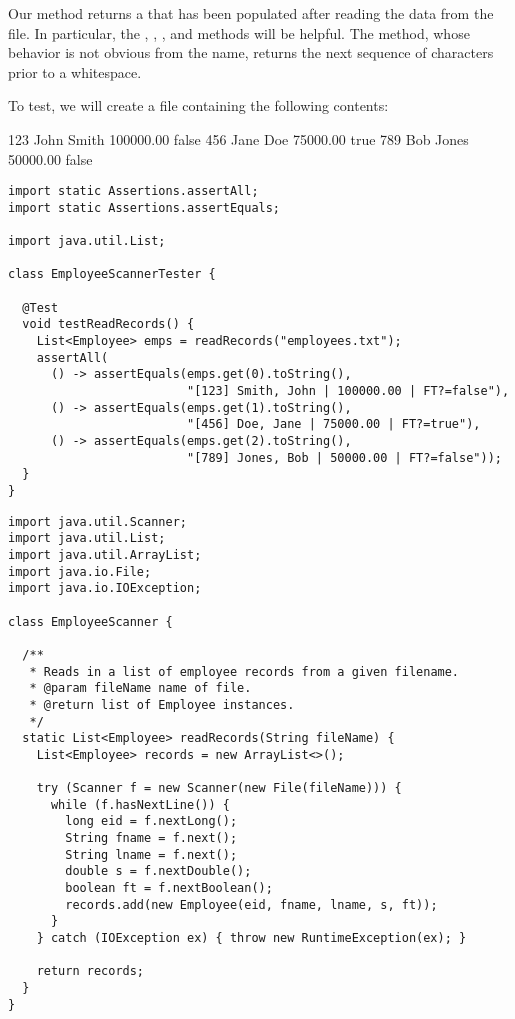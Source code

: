 Our method returns a  that has been populated after reading the data from the file. 
In particular, the , , , and  methods will be helpful. 
The  method, whose behavior is not obvious from the name, returns the next sequence of characters prior to a whitespace. 

To test, we will create a file containing the following contents:

\begin{verbnobox}[\small]
123 John Smith 100000.00 false
456 Jane Doe 75000.00 true
789 Bob Jones 50000.00 false
\end{verbnobox}

\begin{lstlisting}[language=MyJava]
import static Assertions.assertAll;
import static Assertions.assertEquals;

import java.util.List;

class EmployeeScannerTester {

  @Test
  void testReadRecords() {
    List<Employee> emps = readRecords("employees.txt");
    assertAll(
      () -> assertEquals(emps.get(0).toString(), 
                         "[123] Smith, John | 100000.00 | FT?=false"),
      () -> assertEquals(emps.get(1).toString(), 
                         "[456] Doe, Jane | 75000.00 | FT?=true"),
      () -> assertEquals(emps.get(2).toString(), 
                         "[789] Jones, Bob | 50000.00 | FT?=false"));
  }
}
\end{lstlisting}

\begin{lstlisting}[language=MyJava]
import java.util.Scanner;
import java.util.List;
import java.util.ArrayList;
import java.io.File;
import java.io.IOException;

class EmployeeScanner {

  /**
   * Reads in a list of employee records from a given filename.
   * @param fileName name of file.
   * @return list of Employee instances.
   */
  static List<Employee> readRecords(String fileName) {
    List<Employee> records = new ArrayList<>();

    try (Scanner f = new Scanner(new File(fileName))) {
      while (f.hasNextLine()) {
        long eid = f.nextLong();
        String fname = f.next();
        String lname = f.next();
        double s = f.nextDouble();
        boolean ft = f.nextBoolean();
        records.add(new Employee(eid, fname, lname, s, ft));
      }
    } catch (IOException ex) { throw new RuntimeException(ex); }

    return records;
  }
}
\end{lstlisting}

